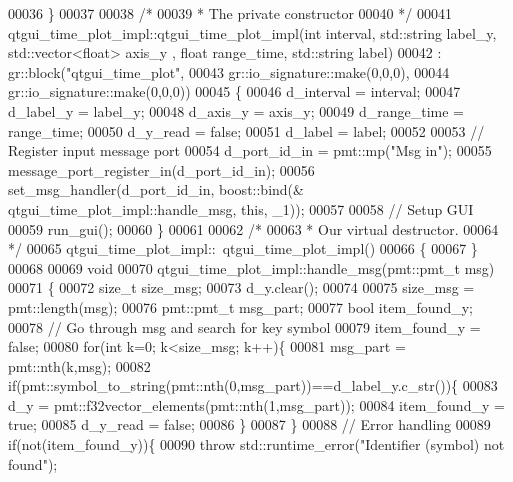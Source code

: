 \begin{DoxyCode}
00036     \}
00037 
00038     \textcolor{comment}{/*}
00039 \textcolor{comment}{     * The private constructor}
00040 \textcolor{comment}{     */}
00041     qtgui_time_plot_impl::qtgui_time_plot_impl(\textcolor{keywordtype}{int} interval, std::string label\_y, std::vector<float> axis\_y
      , \textcolor{keywordtype}{float} range\_time, std::string label)
00042       : gr::block(\textcolor{stringliteral}{"qtgui\_time\_plot"},
00043               gr::io\_signature::make(0,0,0),
00044               gr::io\_signature::make(0,0,0))
00045     \{
00046         d_interval = interval;
00047         d_label_y = label\_y;
00048         d_axis_y = axis\_y;
00049         d_range_time = range\_time;
00050         d_y_read = \textcolor{keyword}{false};
00051         d_label = label;
00052         
00053         \textcolor{comment}{// Register input message port}
00054         d_port_id_in = pmt::mp(\textcolor{stringliteral}{"Msg in"});
00055         message\_port\_register\_in(d_port_id_in);
00056         set\_msg\_handler(d_port_id_in, boost::bind(&
      qtgui_time_plot_impl::handle_msg, \textcolor{keyword}{this}, \_1));
00057         
00058         \textcolor{comment}{// Setup GUI}
00059         run_gui();
00060     \}
00061 
00062     \textcolor{comment}{/*}
00063 \textcolor{comment}{     * Our virtual destructor.}
00064 \textcolor{comment}{     */}
00065     qtgui_time_plot_impl::~qtgui_time_plot_impl()
00066     \{
00067     \}
00068     
00069     \textcolor{keywordtype}{void}
00070     qtgui_time_plot_impl::handle_msg(pmt::pmt\_t msg)
00071     \{
00072         \textcolor{keywordtype}{size\_t} size\_msg;
00073         d_y.clear();
00074         
00075         size\_msg = pmt::length(msg);
00076         pmt::pmt\_t msg\_part;
00077         \textcolor{keywordtype}{bool} item\_found\_y;
00078         \textcolor{comment}{// Go through msg and search for key symbol}
00079         item\_found\_y = \textcolor{keyword}{false};
00080         \textcolor{keywordflow}{for}(\textcolor{keywordtype}{int} k=0; k<size\_msg; k++)\{
00081             msg\_part = pmt::nth(k,msg);
00082             \textcolor{keywordflow}{if}(pmt::symbol\_to\_string(pmt::nth(0,msg\_part))==d_label_y.c\_str())\{
00083                 d_y = pmt::f32vector\_elements(pmt::nth(1,msg\_part));
00084                 item\_found\_y = \textcolor{keyword}{true};
00085                 d_y_read = \textcolor{keyword}{false};
00086             \}
00087         \}
00088         \textcolor{comment}{// Error handling}
00089         \textcolor{keywordflow}{if}(not(item\_found\_y))\{
00090             \textcolor{keywordflow}{throw} std::runtime\_error(\textcolor{stringliteral}{"Identifier (symbol) not found"});

\end{DoxyCode}

